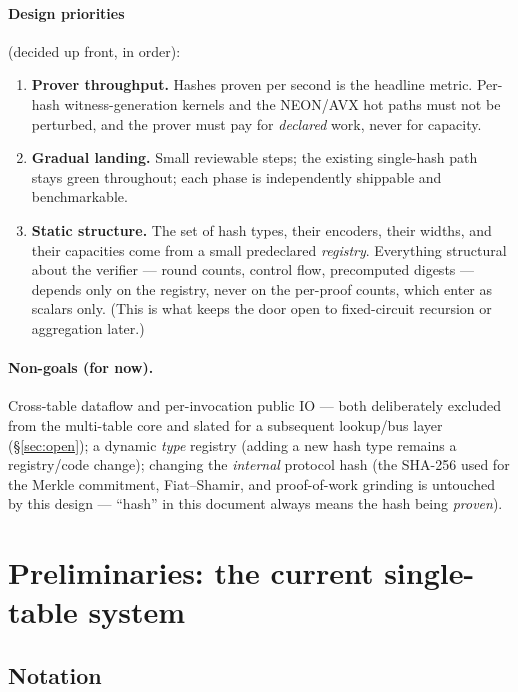 \documentclass[11pt]{article}
\theoremstyle{definition}
\begin{document}
\paragraph{Design priorities} (decided up front, in order):
\begin{enumerate}[nosep]
  \item \textbf{Prover throughput.} Hashes proven per second is the headline
        metric. Per-hash witness-generation kernels and the NEON/AVX hot
        paths must not be perturbed, and the prover must pay for
        \emph{declared} work, never for capacity.
  \item \textbf{Gradual landing.} Small reviewable steps; the existing
        single-hash path stays green throughout; each phase is independently
        shippable and benchmarkable.
  \item \textbf{Static structure.} The set of hash types, their encoders,
        their widths, and their capacities come from a small predeclared
        \emph{registry}. Everything structural about the verifier --- round
        counts, control flow, precomputed digests --- depends only on the
        registry, never on the per-proof counts, which enter as scalars
        only. (This is what keeps the door open to fixed-circuit recursion
        or aggregation later.)
\end{enumerate}

\paragraph{Non-goals (for now).}
Cross-table dataflow and per-invocation public IO --- both deliberately
excluded from the multi-table core and slated for a subsequent lookup/bus
layer (\S\ref{sec:open}); a dynamic \emph{type} registry (adding a new
hash type remains a registry/code change); changing the \emph{internal}
protocol hash (the SHA-256 used for the Merkle commitment, Fiat--Shamir,
and proof-of-work grinding is untouched by this design --- ``hash'' in this
document always means the hash being \emph{proven}).

\section{Preliminaries: the current single-table system}\label{sec:prelim}

\subsection{Notation}
\end{document}
